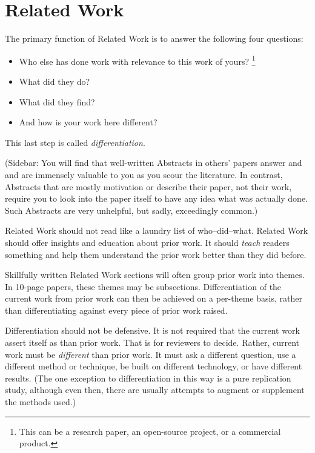 \section{Related Work}
The primary function of Related Work is to answer the following four questions: 
\begin{itemize}
    \item Who else has done work with relevance to this work of yours? \footnote{This can be a research paper, an open-source project, or a commercial product.}
    \item What did they do?
    \item What did they find?
    \item And how is your work here different?
\end{itemize}

This last step is called \emph{differentiation}.

(Sidebar: You will find that well-written Abstracts in others’ papers answer  and  and are immensely valuable to you as you scour the literature. 
In contrast, Abstracts that are mostly motivation or describe their paper, not their work, require you to look into the paper itself to have any idea what was actually done.
Such Abstracts are very unhelpful, but sadly, exceedingly common.)

Related Work should not read like a laundry list of who--did--what.
Related Work should offer insights and education
about prior work.
It should \emph{teach} readers something and help them understand the prior work better than they did before.

Skillfully written Related Work sections will often group prior work into themes. 
In 10-page papers, these themes may be subsections. 
Differentiation of the current work from prior
work can then be achieved on a per-theme basis, rather than differentiating against every piece of prior work raised.

Differentiation should not be defensive. It is not required that the current work assert itself as  than prior work. 
That is for reviewers to decide. Rather, current work must be \emph{different} than prior work. 
It must ask a different question, use a different method or technique, be built on different technology, or have different results. 
(The one exception to differentiation in this way is a pure replication study, although even then, there are usually attempts to augment or supplement the methods used.)